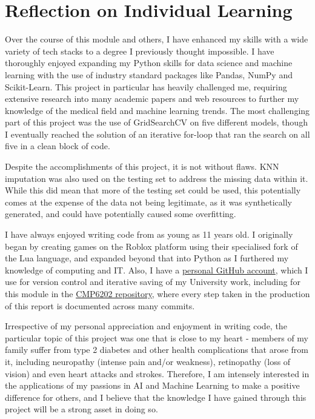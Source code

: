\documentclass[12pt]{report}
\newcommand{\para}{\vspace{8pt}\noindent}
\begin{document}
\section{Reflection on Individual Learning}

Over the course of this module and others, I have enhanced my skills with a wide variety of tech stacks to a degree 
I previously thought impossible. I have thoroughly enjoyed expanding my Python skills for data science and machine learning 
with the use of industry standard packages like Pandas, NumPy and Scikit-Learn. This project in particular has heavily challenged me, 
requiring extensive research into many academic papers and web resources to further my knowledge of the medical field 
and machine learning trends. The most challenging part of this project was the use of GridSearchCV on five different models, though 
I eventually reached the solution of an iterative for-loop that ran the search on all five in a clean block of code.

\para Despite the accomplishments of this project, it is not without flaws. KNN imputation was also used on the testing set to address 
the missing data within it. While this did mean that more of the testing set could be used, this potentially comes at the expense of 
the data not being legitimate, as it was synthetically generated, and could have potentially caused some overfitting.

\para I have always enjoyed writing code from as young as 11 years old. I originally began by creating games on the Roblox platform 
using their specialised fork of the Lua language, and expanded beyond that into Python as I furthered my knowledge of computing 
and IT. Also, I have a \href{https://github.com/LewGoesB00M}{personal GitHub account}, which I use for version control and iterative 
saving of my University work, including for this module in the \href{https://github.com/LewGoesB00M/CMP6202}{CMP6202 repository}, 
where every step taken in the production of this report is documented across many commits.

\para Irrespective of my personal appreciation and enjoyment in writing code, the particular topic of this project was one 
that is close to my heart - members of my family suffer from type 2 diabetes and other health complications that arose from it,
including neuropathy (intense pain and/or weakness), retinopathy (loss of vision) and even heart attacks and strokes. 
Therefore, I am intensely interested in the applications of my passions in AI and Machine Learning to make a positive difference 
for others, and I believe that the knowledge I have gained through this project will be a strong asset in doing so.






\printbibliography
\end{document}
